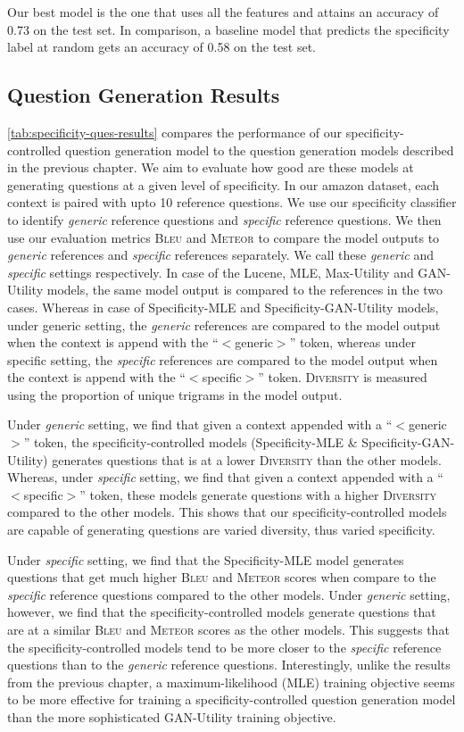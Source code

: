 \documentclass[11pt,a4paper]{article}
\newcommand{\bleu}{\textsc{Bleu}\xspace}
\newcommand{\meteor}{\textsc{Meteor}\xspace}
\newcommand{\diversity}{\textsc{Diversity}\xspace}
\begin{document}
Our best model is the one that uses all the features and attains an accuracy of 0.73 on the test set. 
In comparison, a baseline model that predicts the specificity label at random gets an accuracy of 0.58 on the test set.

\subsection{Question Generation Results}

\autoref{tab:specificity-ques-results} compares the performance of our specificity-controlled question generation model to the question generation models described in the previous chapter.
We aim to evaluate how good are these models at generating questions at a given level of specificity. 
In our amazon dataset, each context is paired with upto 10 reference questions. We use our specificity classifier to identify \textit{generic} reference questions and \textit{specific} reference questions. 
We then use our evaluation metrics  \bleu and \meteor to compare the model outputs to \textit{generic} references and \textit{specific} references separately. We call these \textit{generic} and \textit{specific} settings respectively. 
In case of the Lucene, MLE, Max-Utility and GAN-Utility models, the same model output is compared to the references in the two cases. 
Whereas in case of Specificity-MLE and Specificity-GAN-Utility models, under generic setting, the \textit{generic} references are compared to the model output when the context is append with the ``$<$generic$>$'' token, 
whereas under specific setting, the \textit{specific} references are compared to the model output when the context is append with the ``$<$specific$>$'' token. 
\diversity is measured using the proportion of unique trigrams in the model output. 

Under \textit{generic} setting, we find that given a context appended with a ``$<$generic$>$'' token, the specificity-controlled models (Specificity-MLE \& Specificity-GAN-Utility) generates questions that is at a lower \diversity than the other models.
Whereas, under \textit{specific} setting, we find that given a context appended with a ``$<$specific$>$'' token, these models generate questions with a higher \diversity compared to the other models. 
This shows that our specificity-controlled models are capable of generating questions are varied diversity, thus varied specificity.

Under \textit{specific} setting, we find that the Specificity-MLE model generates questions that get much higher \bleu and \meteor scores when compare to the \textit{specific} reference questions compared to the other models. 
Under \textit{generic} setting, however, we find that the specificity-controlled models generate questions that are at a similar \bleu and \meteor scores as the other models. 
This suggests that the specificity-controlled models tend to be more closer to the  \textit{specific} reference questions than to the \textit{generic} reference questions.
Interestingly, unlike the results from the previous chapter, a maximum-likelihood (MLE) training objective seems to be more effective for training a specificity-controlled question generation model than the more sophisticated GAN-Utility training objective.  
\end{document}
